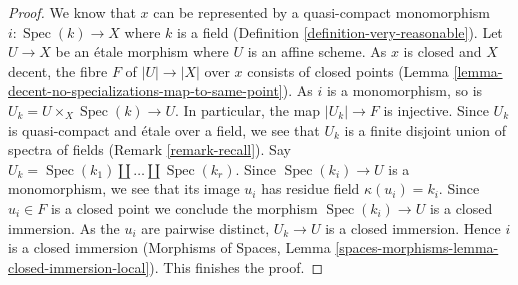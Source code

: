 \documentclass{stacks-project}
\theoremstyle{plain}
\theoremstyle{definition}
\theoremstyle{remark}
\numberwithin{equation}{subsection}
\def\Spec{\mathop{\mathrm{Spec}}}
\begin{document}
\begin{proof}
We know that $x$ can be represented by a quasi-compact monomorphism
$i : \Spec(k) \to X$ where $k$ is a field
(Definition \ref{definition-very-reasonable}).
Let $U \to X$ be an \'etale morphism where $U$ is an affine scheme.
As $x$ is closed and $X$ decent, the fibre $F$ of $|U| \to |X|$ over $x$
consists of closed points
(Lemma \ref{lemma-decent-no-specializations-map-to-same-point}).
As $i$ is a monomorphism, so is $U_k = U \times_X \Spec(k) \to U$.
In particular, the map $|U_k| \to F$ is injective. Since $U_k$
is quasi-compact and \'etale over a field, we see that $U_k$ is a
finite disjoint union of spectra of fields (Remark \ref{remark-recall}).
Say $U_k = \Spec(k_1) \amalg \ldots \amalg \Spec(k_r)$.
Since $\Spec(k_i) \to U$ is a monomorphism, we see that
its image $u_i$ has residue field $\kappa(u_i) = k_i$.
Since $u_i \in F$ is a closed point we conclude the morphism
$\Spec(k_i) \to U$ is a closed immersion. As the $u_i$ are pairwise distinct,
$U_k \to U$ is a closed immersion. Hence $i$ is a closed immersion
(Morphisms of Spaces, Lemma
\ref{spaces-morphisms-lemma-closed-immersion-local}). This finishes the proof.
\end{proof}
\end{document}
